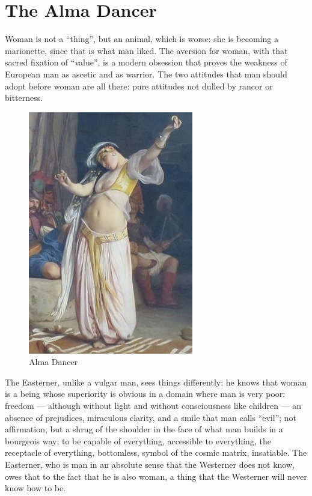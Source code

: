 \section{The Alma Dancer}

Woman is not a “thing”, but an animal, which is worse: she is becoming a marionette, since that is what man liked. The aversion for woman, with that sacred fixation of “value”, is a modern obsession that proves the weakness of European man as ascetic and as warrior. The two attitudes that man should adopt before woman are all there: pure attitudes not dulled by rancor or bitterness.

\begin{figure}
 \includegraphics[scale=.5]{a20150517TheAlmaDancer-img001.jpg}
\caption{Alma Dancer}
\end{figure}

The Easterner, unlike a vulgar man, sees things differently: he knows that woman is a being whose superiority is obvious in a domain where man is very poor: freedom — although without light and without consciousness like children — an absence of prejudices, miraculous clarity, and a smile that man calls “evil”; not affirmation, but a shrug of the shoulder in the face of what man builds in a bourgeois way; to be capable of everything, accessible to everything, the receptacle of everything, bottomless, symbol of the cosmic matrix, insatiable. The Easterner, who is man in an absolute sense that the Westerner does not know, owes that to the fact that he is also woman, a thing that the Westerner will never know how to be.


